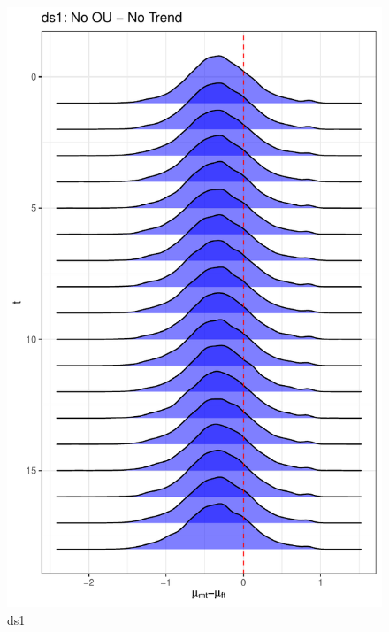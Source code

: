 \documentclass[
  12pt,
]{article}
\begin{document}
\begin{figure}

{\centering \includegraphics[width=0.9\linewidth]{../Figures/ds1/mu_diff} 

}

\caption{ds1}\label{fig:unnamed-chunk-8}
\end{figure}
\end{document}
